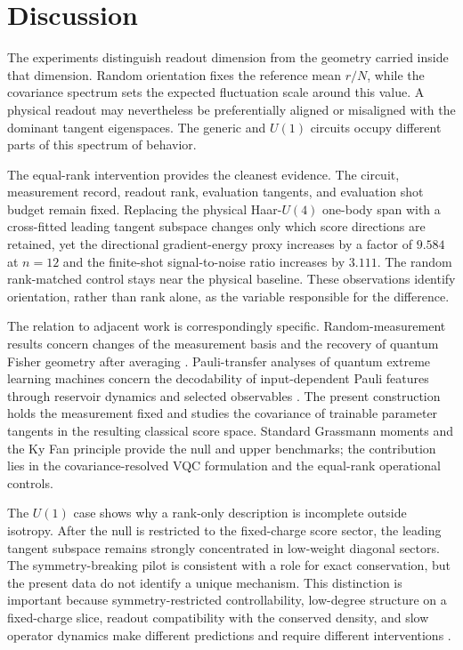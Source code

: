 \documentclass[ASNA,twocolumn]{USG}
\begin{document}
\section{Discussion}

The experiments distinguish readout dimension from the geometry carried inside that dimension. Random orientation fixes the reference mean $r/N$, while the covariance spectrum sets the expected fluctuation scale around this value. A physical readout may nevertheless be preferentially aligned or misaligned with the dominant tangent eigenspaces. The generic and $U(1)$ circuits occupy different parts of this spectrum of behavior.

The equal-rank intervention provides the cleanest evidence. The circuit, measurement record, readout rank, evaluation tangents, and evaluation shot budget remain fixed. Replacing the physical Haar-$U(4)$ one-body span with a cross-fitted leading tangent subspace changes only which score directions are retained, yet the directional gradient-energy proxy increases by a factor of $9.584$ at $n=12$ and the finite-shot signal-to-noise ratio increases by $3.111$. The random rank-matched control stays near the physical baseline. These observations identify orientation, rather than rank alone, as the variable responsible for the difference.

The relation to adjacent work is correspondingly specific. Random-measurement results concern changes of the measurement basis and the recovery of quantum Fisher geometry after averaging \cite{LuSha2025}. Pauli-transfer analyses of quantum extreme learning machines concern the decodability of input-dependent Pauli features through reservoir dynamics and selected observables \cite{GrossRieser2026}. The present construction holds the measurement fixed and studies the covariance of trainable parameter tangents in the resulting classical score space. Standard Grassmann moments and the Ky Fan principle provide the null and upper benchmarks; the contribution lies in the covariance-resolved VQC formulation and the equal-rank operational controls.

The $U(1)$ case shows why a rank-only description is incomplete outside isotropy. After the null is restricted to the fixed-charge score sector, the leading tangent subspace remains strongly concentrated in low-weight diagonal sectors. The symmetry-breaking pilot is consistent with a role for exact conservation, but the present data do not identify a unique mechanism. This distinction is important because symmetry-restricted controllability, low-degree structure on a fixed-charge slice, readout compatibility with the conserved density, and slow operator dynamics make different predictions and require different interventions \cite{Monbroussou2025,Fontana2024,Ragone2024,Filmus2016,Khemani2018,Rakovszky2018}.
\end{document}
